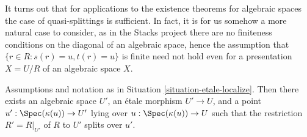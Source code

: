 \noindent
It turns out that for applications to the existence theorems for algebraic
spaces the case of quasi-splittings is sufficient. In fact, it is for us
somehow a more natural case to consider, as in the Stacks project there
are no finiteness conditions on the diagonal of an algebraic space, hence
the assumption that $\{r \in R : s(r) = u, t(r) = u\}$ is finite need
not hold even for a presentation $X = U/R$ of an algebraic space $X$.

\begin{lemma}
\label{lemma-splitting-general}
Assumptions and notation as in
Situation \ref{situation-etale-localize}.
Then there exists an algebraic space $U'$, an \'etale morphism
$U' \to U$, and a point $u' : \Spec(\kappa(u)) \to U'$
lying over $u : \Spec(\kappa(u)) \to U$
such that the restriction $R' = R|_{U'}$ of $R$ to $U'$
splits over $u'$.
\end{lemma}

